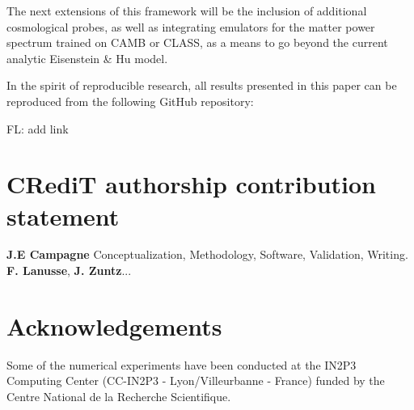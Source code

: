 \documentclass[twocolumn,twocolappendix,nofootinbib,iop]{openjournal}
\newcommand{\FrL}[1]{{\color{cyan}FL: #1}}
\begin{document}
\bigskip

The next extensions of this framework will be the inclusion of additional cosmological probes, as well as integrating emulators for the matter power spectrum trained on CAMB or CLASS, as a means to go beyond the current analytic Eisenstein \& Hu model.


\bigskip

In the spirit of reproducible research, all results presented in this paper can be reproduced from the following GitHub repository:

\FrL{add link}



%
%
%
%
%

\section*{CRediT authorship contribution statement}
\textbf{J.E Campagne} Conceptualization, Methodology, Software, Validation, Writing.
\textbf{F. Lanusse}, \textbf{J. Zuntz}...


\section*{Acknowledgements}
Some of the numerical experiments have been conducted at the IN2P3 Computing Center (CC-IN2P3 - Lyon/Villeurbanne - France) funded by the Centre National de la Recherche Scientifique.


\appendix
\end{document}
